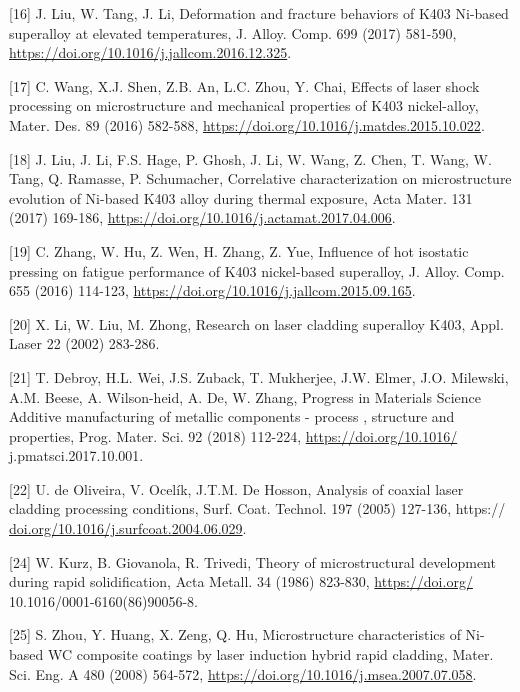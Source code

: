 \documentclass[10pt]{article}
\begin{document}
[16] J. Liu, W. Tang, J. Li, Deformation and fracture behaviors of K403 Ni-based superalloy at elevated temperatures, J. Alloy. Comp. 699 (2017) 581-590, \href{https://doi.org/10.1016/j.jallcom.2016.12.325}{https://doi.org/10.1016/j.jallcom.2016.12.325}.

[17] C. Wang, X.J. Shen, Z.B. An, L.C. Zhou, Y. Chai, Effects of laser shock processing on microstructure and mechanical properties of K403 nickel-alloy, Mater. Des. 89 (2016) 582-588, \href{https://doi.org/10.1016/j.matdes.2015.10.022}{https://doi.org/10.1016/j.matdes.2015.10.022}.

[18] J. Liu, J. Li, F.S. Hage, P. Ghosh, J. Li, W. Wang, Z. Chen, T. Wang, W. Tang, Q. Ramasse, P. Schumacher, Correlative characterization on microstructure evolution of Ni-based K403 alloy during thermal exposure, Acta Mater. 131 (2017) 169-186, \href{https://doi.org/10.1016/j.actamat.2017.04.006}{https://doi.org/10.1016/j.actamat.2017.04.006}.

[19] C. Zhang, W. Hu, Z. Wen, H. Zhang, Z. Yue, Influence of hot isostatic pressing on fatigue performance of K403 nickel-based superalloy, J. Alloy. Comp. 655 (2016) 114-123, \href{https://doi.org/10.1016/j.jallcom.2015.09.165}{https://doi.org/10.1016/j.jallcom.2015.09.165}.

[20] X. Li, W. Liu, M. Zhong, Research on laser cladding superalloy K403, Appl. Laser 22 (2002) 283-286.

[21] T. Debroy, H.L. Wei, J.S. Zuback, T. Mukherjee, J.W. Elmer, J.O. Milewski, A.M. Beese, A. Wilson-heid, A. De, W. Zhang, Progress in Materials Science Additive manufacturing of metallic components - process , structure and properties, Prog. Mater. Sci. 92 (2018) 112-224, \href{https://doi.org/10.1016/}{https://doi.org/10.1016/} j.pmatsci.2017.10.001.

[22] U. de Oliveira, V. Ocelík, J.T.M. De Hosson, Analysis of coaxial laser cladding processing conditions, Surf. Coat. Technol. 197 (2005) 127-136, https:// \href{http://doi.org/10.1016/j.surfcoat.2004.06.029}{doi.org/10.1016/j.surfcoat.2004.06.029}.

[24] W. Kurz, B. Giovanola, R. Trivedi, Theory of microstructural development during rapid solidification, Acta Metall. 34 (1986) 823-830, \href{https://doi.org/}{https://doi.org/} 10.1016/0001-6160(86)90056-8.

[25] S. Zhou, Y. Huang, X. Zeng, Q. Hu, Microstructure characteristics of Ni-based WC composite coatings by laser induction hybrid rapid cladding, Mater. Sci. Eng. A 480 (2008) 564-572, \href{https://doi.org/10.1016/j.msea.2007.07.058}{https://doi.org/10.1016/j.msea.2007.07.058}.
\end{document}
